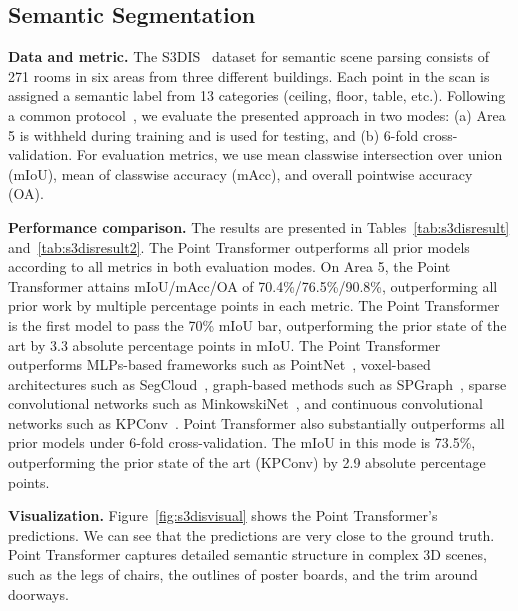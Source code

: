 \documentclass[final]{cvpr}
\newcommand\mypara[1]{\vspace{1mm}\noindent\textbf{#1}}
\begin{document}
\subsection{Semantic Segmentation}

\noindent\textbf{Data and metric.}
The S3DIS~\cite{armeni2016s3dis} dataset for semantic scene parsing consists of 271 rooms in six areas from three different buildings. Each point in the scan is assigned a semantic label from 13 categories (ceiling, floor, table, etc.). Following a common protocol~\cite{tchapmi2017segcloud,qi2017pointnet2}, we evaluate the presented approach in two modes: (a) Area 5 is withheld during training and is used for testing, and (b) 6-fold cross-validation. For evaluation metrics, we use mean classwise intersection over union (mIoU), mean of classwise accuracy (mAcc), and overall pointwise accuracy (OA).

\mypara{Performance comparison.}
The results are presented in Tables~\ref{tab:s3disresult} and~\ref{tab:s3disresult2}. The Point Transformer outperforms all prior models according to all metrics in both evaluation modes. On Area 5, the Point Transformer attains mIoU/mAcc/OA of 70.4\%/76.5\%/90.8\%, outperforming all prior work by multiple percentage points in each metric. The Point Transformer is the first model to pass the 70\% mIoU bar, outperforming the prior state of the art by 3.3 absolute percentage points in mIoU.
The Point Transformer outperforms MLPs-based frameworks such as PointNet~\cite{qi2017pointnet}, voxel-based architectures such as SegCloud~\cite{tchapmi2017segcloud}, graph-based methods such as SPGraph~\cite{landrieu2018spg}, sparse convolutional networks such as MinkowskiNet~\cite{choy20194d}, and continuous convolutional networks such as KPConv~\cite{thomas2019kpconv}.
Point Transformer also substantially outperforms all prior models under 6-fold cross-validation. The mIoU in this mode is 73.5\%, outperforming the prior state of the art (KPConv) by 2.9 absolute percentage points.

\mypara{Visualization.}
Figure~\ref{fig:s3disvisual} shows the Point Transformer's predictions.
We can see that the predictions are very close to the ground truth. Point Transformer captures detailed semantic structure in complex 3D scenes, such as the legs of chairs, the outlines of poster boards, and the trim around doorways.
\end{document}
